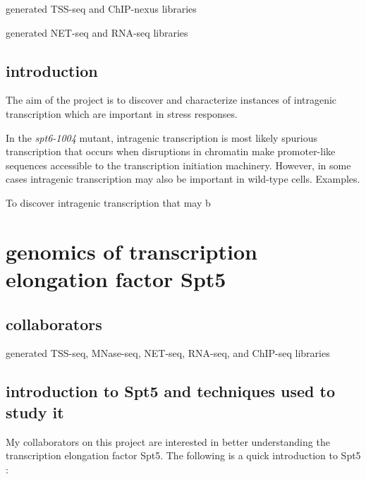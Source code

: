 \documentclass[9pt, letterpaper]{article}
\begin{document}
\begin{description}[align=right, labelwidth=5cm, noitemsep]
    \item [Steve Doris] generated TSS-seq and ChIP-nexus libraries
    \item [Blake Tye] generated NET-seq and RNA-seq libraries
\end{description}

\subsection{introduction}

The aim of the project is to discover and characterize instances of intragenic transcription which are important in stress responses.

In the \textit{spt6-1004} mutant, intragenic transcription is most likely spurious transcription that occurs when disruptions in chromatin make promoter-like sequences accessible to the transcription initiation machinery. However, in some cases intragenic transcription may also be important in wild-type cells. Examples.

To discover intragenic transcription that may b



\section{genomics of transcription elongation factor Spt5}

\subsection{collaborators}

\begin{description}[align=right, labelwidth=5cm, noitemsep]
    \item [Ameet Shetty] generated TSS-seq, MNase-seq, NET-seq, RNA-seq, and ChIP-seq libraries
\end{description}

\subsection{introduction to Spt5 and techniques used to study it}

My collaborators on this project are interested in better understanding the transcription elongation factor Spt5. The following is a quick introduction to Spt5 \cite{shetty2017}:
\end{document}
